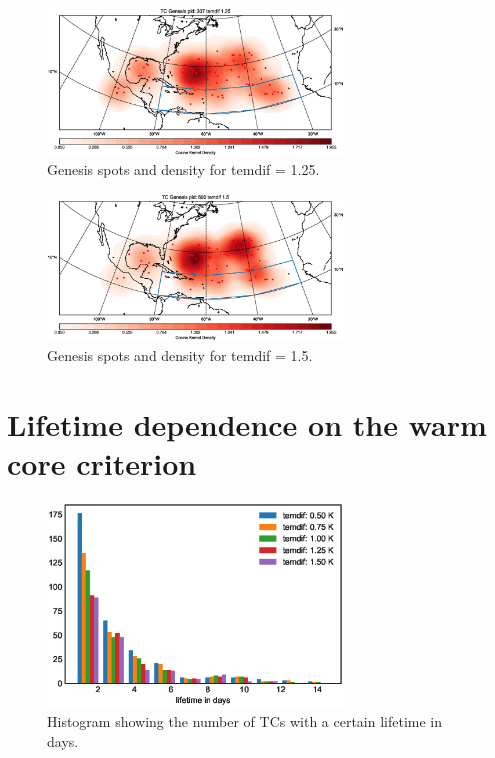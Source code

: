 \begin{figure}[ht]
	\centering
	\includegraphics[width=0.7\textwidth]{img/genesis_plot_temdif125.eps}
	\caption{Genesis spots and density for temdif = 1.25.}
\end{figure}
\begin{figure}[ht]
	\centering
	\includegraphics[width=0.7\textwidth]{img/genesis_plot_temdif15.eps}
	\caption{Genesis spots and density for temdif = 1.5.}
\end{figure}

\chapter{Lifetime dependence on the warm core criterion}\label{sec:lifetime-appendix}

\begin{figure}[ht]
	\centering
	\includegraphics[width=0.7\textwidth]{img/lifetime_for_different_temdif.eps}
	\caption{Histogram showing the number of TCs with a certain lifetime in days.}
\end{figure}

